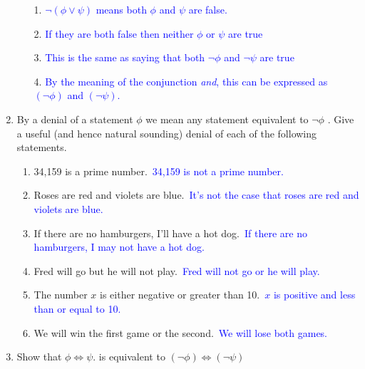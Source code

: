 \documentclass[13.5pt]{article}
\begin{document}
\begin{enumerate}
{\begin{enumerate}
\setlength{\itemindent}{.1in} 
\item[1.]  \textcolor{blue} {\(\neg (\phi \vee \psi)\) means both \(\phi\) and \(\psi\) are false.}
\item[2.] \textcolor{blue}{If they are both false then neither \(\phi\) or \(\psi\) are true }
\item[3.] \textcolor{blue}{This is the same as saying that both \(\neg \phi\) and \(\neg \psi\) are true }
\item[4.] \textcolor{blue}{By the meaning of the conjunction \textit{and}, this can be expressed as \((\neg \phi)\) and \((\neg \psi)\).}
\end{enumerate}}

\item{ By a denial of a statement \(\phi\)  we mean any statement equivalent to \(\neg \phi\) . Give a useful (and hence natural sounding) denial of each of the following statements.}

\begin{enumerate}
\setlength{\itemindent}{.1in}
\item{34,159 is a prime number.}\
\textcolor{blue} {34,159 is not a prime number.}
\item{Roses are red and violets are blue.}\
\textcolor{blue} {It's not the case that roses are red and violets are blue.}
\item{If there are no hamburgers, I'll have a hot dog.}\
\textcolor{blue} {If there are no hamburgers, I may not have a hot dog.}
\item{Fred will go but he will not play.}\
\textcolor{blue} {Fred will not go or he will play.}
\item{The number \(x\) is either negative or greater than 10.}\
\textcolor{blue} {\(x\) is positive and less than or equal to 10.}
\item{We will win the first game or the second.}\
\textcolor{blue} {We will lose both games.}
\end{enumerate}

\item{Show that \(\phi \Leftrightarrow \psi\). is equivalent to \((\neg \phi) \Leftrightarrow (\neg \psi)\)  }


\end{enumerate}
\end{document}
